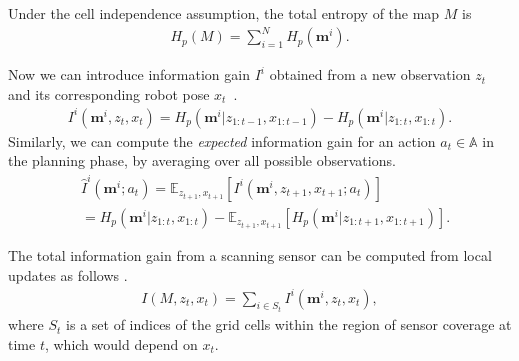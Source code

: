 \documentclass{article}
\newcommand{\note}[1]{{\color{cyan} NOTE: #1 }}
\begin{document}
Under the cell independence assumption, the total entropy of the map $M$ is
\begin{align}
  H_p(M) = \textstyle \sum_{i = 1}^N H_{p}(\mathbf{m}^i).
\end{align}

Now we can introduce information gain $I^i$ obtained from a new observation $z_t$ and its corresponding robot pose $x_t$~\cite{cover2012elements}.
\begin{align}
  I^i(\mathbf{m}^i, z_t, x_t) = H_p(\mathbf{m}^i | z_{1:t-1}, x_{1:t-1}) - H_p(\mathbf{m}^i | z_{1:t}, x_{1:t}).
\end{align}
Similarly, we can compute the \textit{expected} information gain for an action $a_t \in \mathbb{A}$ in the planning phase, by averaging over all possible observations.
\begin{align}
  &\hat{I}^i(\mathbf{m}^i; a_t)
  = \mathbb{E}_{z_{t+1}, x_{t+1}} [ I^i (\mathbf{m}^i, z_{t+1}, x_{t+1}; a_t) ] \nonumber \\
  &\!\!= H_p(\mathbf{m}^i | z_{1:t}, x_{1:t}) - \mathbb{E}_{z_{t+1}, x_{t+1}} [ H_p (\mathbf{m}^i | z_{1:t+1}, x_{1:t+1}) ].
\end{align}

The total information gain from a scanning sensor can be computed from local updates as follows
\cite{bourgault2002information}.
\begin{align}
  I(M, z_t, x_t) = \sum_{i \in S_t} I^i(\mathbf{m}^i, z_t, x_t),
  \label{eq:infogain}
\end{align}
where $S_t$ is a set of indices of the grid cells within the region of sensor coverage at time $t$, which would depend on $x_t$.



\end{document}
